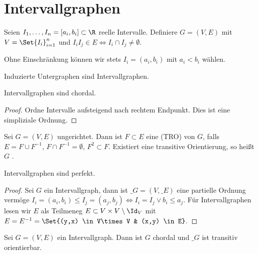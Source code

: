 \section{Intervallgraphen}


\begin{df}
    Seien $I_1, \dotsc, I_n = [a_i, b_i] \subset \R$ reelle Intervalle.
    Definiere $G = (V, E)$ mit $V = \Set{I_i}_{i=1}^n$ und $I_iI_j \in E \iff I_i \cap I_j \neq \emptyset$.
    \begin{note}
        Ohne Einschränkung können wir stets $I_i = (a_i, b_i)$ mit $a_i < b_i$ wählen.

        Induzierte Untergraphen sind Intervallgraphen.
    \end{note}
\end{df}

\begin{lem}
    Intervallgraphen sind chordal.
    \begin{proof}
        Ordne Intervalle aufsteigend nach rechtem Endpunkt.
        Dies ist eine simpliziale Ordnung.
    \end{proof}
\end{lem}

\begin{df}
    Sei $G = (V, E)$ ungerichtet.
    Dann ist $F \subset E$ eine  (TRO) von $G$, falls $E = F \cup F^{-1}$, $F \cap F^{-1} = \emptyset$, $F^2 \subset F$.
    Existiert eine transitive Orientierung, so heißt $G$ .
\end{df}

\begin{st}
    Intervallgraphen sind perfekt.
    \begin{proof}
        Sei $G$ ein Intervallgraph, dann ist $\_G = (V, \_E)$ eine partielle Ordnung vermöge
        \begin{math}
            I_i = (a_i, b_i) \le I_j = (a_j, b_j) \iff I_i = I_j \lor b_i \le a_j.
        \end{math}
        Für Intervallgraphen lesen wir $E$ als Teilmeneg $E \subset V \times V \setminus \Id_V$ mit
        \begin{math}
            E = E^{-1} = \Set{(y,x) \in V\times V & (x,y) \in E}.
        \end{math}
    \end{proof}
\end{st}

\begin{lem}
    Sei $G = (V,E)$ ein Intervallgraph.
    Dann ist $G$ chordal und $\_G$ ist transitiv orientierbar.
\end{lem}

